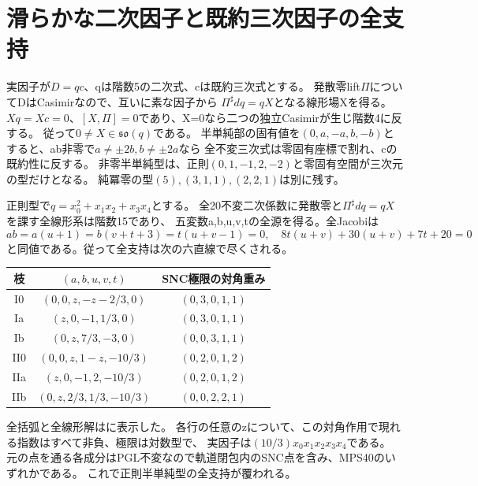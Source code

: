 \documentclass[a4paper,11pt]{ltjsarticle}
\theoremstyle{definition}
\begin{document}
\section{滑らかな二次因子と既約三次因子の全支持}
実因子が$D=qc$、qは階数5の二次式、cは既約三次式とする。
発散零lift$\Pi$についてDはCasimirなので、互いに素な因子から
$\Pi^\sharp dq=qX$となる線形場Xを得る。
$Xq=Xc=0$、$[X,\Pi]=0$であり、X=0なら二つの独立Casimirが生じ階数4に反する。
従って$0\ne X\in\mathfrak{so}(q)$である。
半単純部の固有値を$(0,a,-a,b,-b)$とすると、ab非零で$a\ne\pm2b,b\ne\pm2a$なら
全不変三次式は零固有座標で割れ、cの既約性に反する。
非零半単純型は、正則$(0,1,-1,2,-2)$と零固有空間が三次元の型だけとなる。
純冪零の型$(5),(3,1,1),(2,2,1)$は別に残す。

正則型で$q=x_0^2+x_1x_2+x_3x_4$とする。
全20不変二次係数に発散零と$\Pi^\sharp dq=qX$を課す全線形系は階数15であり、
五変数a,b,u,v,tの全源を得る。全Jacobiは
\[
 ab=a(u+1)=b(v+t+3)=t(u+v-1)=0,\quad
 8t(u+v)+30(u+v)+7t+20=0
\]
と同値である。従って全支持は次の六直線で尽くされる。
\begin{center}\small
\begin{tabular}{c|c|c}
枝&$(a,b,u,v,t)$&SNC極限の対角重み\\\hline
I0&$(0,0,z,-z-2/3,0)$&$(0,3,0,1,1)$\\
Ia&$(z,0,-1,1/3,0)$&$(0,3,0,1,1)$\\
Ib&$(0,z,7/3,-3,0)$&$(0,0,3,1,1)$\\
II0&$(0,0,z,1-z,-10/3)$&$(0,2,0,1,2)$\\
IIa&$(z,0,-1,2,-10/3)$&$(0,2,0,1,2)$\\
IIb&$(0,z,2/3,1/3,-10/3)$&$(0,0,2,2,1)$
\end{tabular}
\end{center}
全括弧と全線形解はに表示した。
各行の任意のzについて、この対角作用で現れる指数はすべて非負、極限は対数型で、
実因子は$(10/3)x_0x_1x_2x_3x_4$である。
元の点を通る各成分はPGL不変なので軌道閉包内のSNC点を含み、MPS40のいずれかである。
これで正則半単純型の全支持が覆われる。
\end{document}
